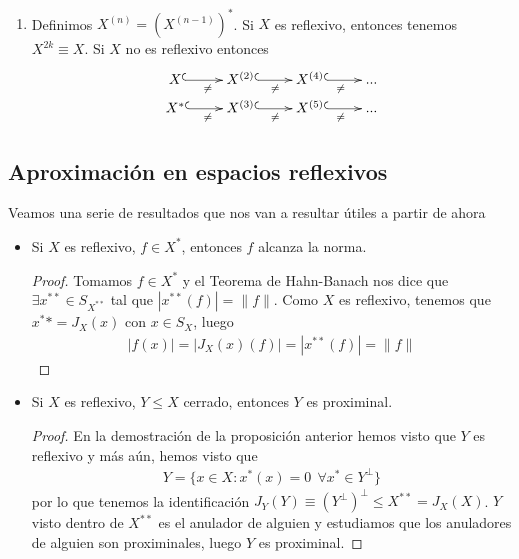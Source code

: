 \begin{observacion}\
    \begin{enumerate}
        \item Definimos $X^{(n)}=(X^{(n-1)})^*$. Si $X$ es reflexivo, entonces tenemos $X^{2k}\equiv X$. Si $X$ no es reflexivo entonces 
        \begin{gather*}
            \xymatrix@R=2mm{
                X \ar@{^(->}[r]_{\neq} & X^{(2)} \ar@{^(->}[r]_{\neq} & X^{(4)} \ar@{^(->}[r]_{\neq} & ... \\
                X^* \ar@{^(->}[r]_{\neq} & X^{(3)} \ar@{^(->}[r]_{\neq} & X^{(5)} \ar@{^(->}[r]_{\neq} & ... \\
            }
        \end{gather*}
    \end{enumerate}
\end{observacion}

\subsection{Aproximación en espacios reflexivos}

Veamos una serie de resultados que nos van a resultar útiles a partir de ahora

\begin{itemize}
    \item Si $X$ es reflexivo, $f\in X^*$, entonces $f$ alcanza la norma.
    \begin{proof}
        Tomamos $f\in X^*$ y el Teorema de Hahn-Banach nos dice que $\exists x^{**}\in S_{X^{**}}$ tal que $|x^{**}(f)| = \|f\|$. Como $X$ es reflexivo, tenemos que $x^**=J_X(x)$ con $x\in S_X$, luego
        \begin{gather*}
            |f(x)| = |J_X(x)(f)| = |x^{**}(f)| = \|f\|
        \end{gather*}
    \end{proof} 

    \item Si $X$ es reflexivo, $Y\leq X$ cerrado, entonces $Y$ es proximinal.
    \begin{proof}
        En la demostración de la proposición anterior hemos visto que $Y$ es reflexivo y más aún, hemos visto que 
        \begin{gather*}
            Y= \{x\in X : x^*(x)=0\ \ \forall x^* \in Y^{\perp}\}
        \end{gather*}
        por lo que tenemos la identificación $J_Y(Y)\equiv(Y^{\perp})^{\perp}\leq X^{**}=J_X(X)$. $Y$ visto dentro de $X^{**}$ es el anulador de alguien y estudiamos que los anuladores de alguien son proximinales, luego $Y$ es proximinal.
    \end{proof}
\end{itemize}


